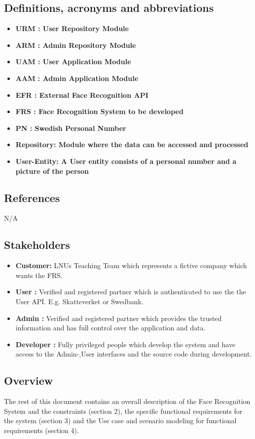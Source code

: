 \documentclass[a4paper,11pt]{article}
\begin{document}
\subsection{Definitions, acronyms and abbreviations}
\label{ReqDefinitions}
\begin{itemize}
\item \textbf{URM : User Repository Module}
\item \textbf{ARM : Admin Repository Module}
\item \textbf{UAM : User Application Module}
\item \textbf{AAM : Admin Application Module}
\item \textbf{EFR : External Face Recognition API}
\item \textbf{FRS : Face Recognition System to be developed}
\item \textbf{PN : Swedish Personal Number}
\item \textbf{Repository: Module where the data can be accessed and processed}
\item \textbf{User-Entity: A User entity consists of a personal number and a picture of the person}
\end{itemize}

\subsection{References}
N/A
\subsection{Stakeholders} \label{Roles}
\begin{itemize}
\item \textbf{Customer: } LNUs Teaching Team which represents a fictive company which wants the FRS.
\item \textbf{User :} Verified and registered partner which is authenticated to use the the User API. E.g. Skatteverket or Swedbank.
\item \textbf{Admin :} Verified and registered partner which provides the trusted information and has full control over the application and data.
\item \textbf{Developer :} Fully privileged people which develop the system and have access to the Admin-,User interfaces and the source code during development.
\end{itemize}

\subsection{Overview}
The rest of this document contains an overall description of the Face Recognition System and the constraints (section 2), the specific functional requirements for the system (section 3) and the Use case and scenario modeling for functional requirements (section 4).
\end{document}
